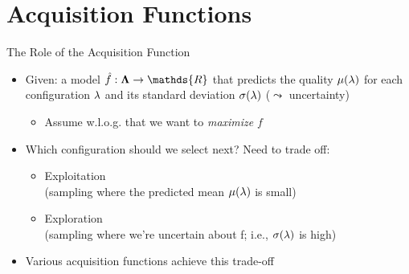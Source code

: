 \section{Acquisition Functions}

\begin{frame}[c,fragile]{The Role of the Acquisition Function}
\begin{itemize}
  \item Given: a model $\hat{f}:\confs \rightarrow \mathds{R}$ that predicts the quality $\mu(\mathbf{\lambda})$ for each configuration $\mathbf{\lambda}$ and its standard deviation $\sigma(\mathbf{\lambda})$ ($\leadsto$ uncertainty)
  \begin{itemize}
  	\item Assume w.l.o.g. that we want to \emph{maximize} $f$
  \end{itemize}
  \medskip
  \pause
  \item Which configuration should we select next? Need to trade off: 
  \begin{itemize}
    \item \alert{Exploitation}\\(sampling where the predicted mean $\mu(\mathbf{\lambda})$ is small)
    \item \alert{Exploration}\\(sampling where we're uncertain about f; i.e., $\sigma(\mathbf{\lambda})$ is high)
  \end{itemize}
  \medskip
  \pause
  \item Various acquisition functions achieve this trade-off
\end{itemize}

\end{frame}


